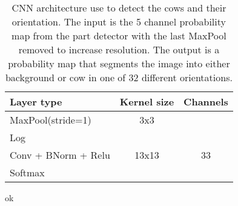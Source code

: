 \documentclass[10pt,a4paper,twocolumn]{article}
\begin{document}
\begin{table}
\begin{tabular}{|l|c|c|}
\hline 
\textbf{Layer type} & \textbf{Kernel size} & \textbf{Channels} \\ 
\hline 

MaxPool(stride=1) & 3x3 &  \\ 
Log & & \\
Conv + BNorm + Relu & 13x13 & 33 \\ 
Softmax & & \\
\hline 
\end{tabular}
\caption{CNN architecture use to detect the cows and their orientation. The input is the 5 channel probability map from the part detector with the last MaxPool removed to increase resolution. The output is a probability map that segments the image into either background or cow in one of 32 different orientations.}
\label{tab:cowdirnet}
\end{table}

ok
\end{document}
